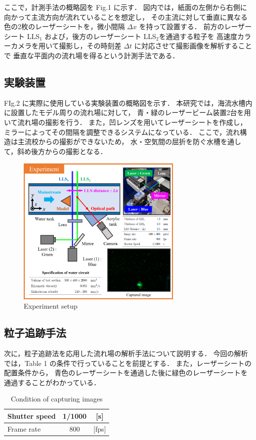 \documentclass[twocolumn,a4j]{jsarticle}
\begin{document}
\newpage
ここで，計測手法の概略図を Fig.1 に示す．
図内では，紙面の左側から右側に向かって主流方向が流れていることを想定し，
その主流に対して垂直に異なる色の2枚のレーザーシートを，微小間隔 $\Delta x$ を持って設置する．
前方のレーザーシート LLS$_1$ および，後方のレーザーシート LLS$_2$を通過する粒子を
高速度カラーカメラを用いて撮影し，その時刻差 $\Delta t$ に対応させて撮影画像を解析することで
垂直な平面内の流れ場を得るという計測手法である．

\subsection{実験装置}

FIg.2 に実際に使用している実験装置の概略図を示す．
本研究では，海流水槽内に設置したモデル周りの流れ場に対して，
青・緑のレーザービーム装置2台を用いて流れ場の撮影を行う．
また，凹レンズを用いてレーザーシートを作成し，
ミラーによってその間隔を調整できるシステムになっている．
ここで，流れ構造は主流校からの撮影ができないため，
水・空気間の屈折を防ぐ水槽を通して，斜め後方からの撮影となる．

\begin{figure}[htbp]
	\centering
	\includegraphics[keepaspectratio, width=80mm]{../images/experiment.png}
	\caption{Experiment setup}
\end{figure}

\newpage
\subsection{粒子追跡手法}
次に，粒子追跡法を応用した流れ場の解析手法について説明する．
今回の解析では，Table 1 の条件で行っていることを前提とする．
また，レーザーシートの配置条件から，
青色のレーザーシートを通過した後に緑色のレーザーシートを通過することがわかっている．
\begin{table}[hbtp]
	\centering
	\caption{Condition of capturing images}
	\begin{tabular}{l c c}
		\hline
		Shutter speed & 1/1000 & [s]   \\ \hline
		Frame rate    & 800    & [fps] \\ \hline
	\end{tabular}
\end{table}
\end{document}
